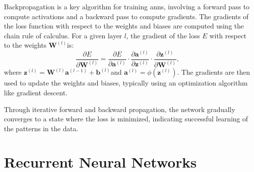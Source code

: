 \documentclass[12pt, a4paper, headinclude, twoside, plainheadsepline, open=right, numbers=noenddot, hidelinks, toc=listof, toc=bibliography]{scrreprt}
\begin{document}
Backpropagation is a key algorithm for training \acp{ann}, involving a forward pass to compute activations and a backward pass to compute gradients. 
The gradients of the loss function with respect to the weights and biases are computed using the chain rule of calculus. For a given layer $l$, the gradient of the loss $E$ with respect to the weights $\mathbf{W}^{(l)}$is:
\begin{equation}
\frac{\partial E}{\partial \mathbf{W}^{(l)}} = \frac{\partial E}{\partial \mathbf{a}^{(l)}} \cdot \frac{\partial \mathbf{a}^{(l)}}{\partial \mathbf{z}^{(l)}} \cdot \frac{\partial \mathbf{z}^{(l)}}{\partial \mathbf{W}^{(l)}},
\end{equation}
where $\mathbf{z}^{(l)} = \mathbf{W}^{(l)} \mathbf{a}^{(l-1)} + \mathbf{b}^{(l)}$and $\mathbf{a}^{(l)} = \phi(\mathbf{z}^{(l)})$. 
The gradients are then used to update the weights and biases, typically using an optimization algorithm like gradient descent.

Through iterative forward and backward propagation, the network gradually converges to a state where the loss is minimized, indicating successful learning of the patterns in the data.

\section{Recurrent Neural Networks}
\label{sec:rnn}
\end{document}
